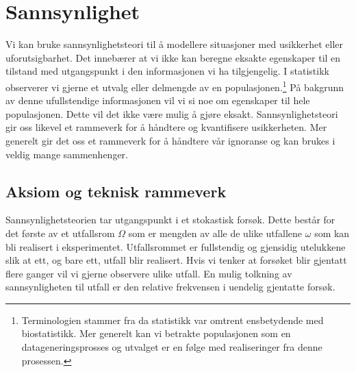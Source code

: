 \chapter{Sannsynlighet}
Vi kan bruke sannsynlighetsteori til å modellere situasjoner med usikkerhet eller uforutsigbarhet. Det innebærer at vi ikke kan beregne eksakte egenskaper til en tilstand med utgangspunkt i den informasjonen vi ha tilgjengelig. I statistikk observerer vi gjerne et utvalg eller delmengde av en populasjonen.\footnote{Terminologien stammer fra da statistikk var omtrent ensbetydende med biostatistikk. Mer generelt kan vi betrakte populasjonen som en datageneringsprosses og utvalget er en følge med realiseringer fra denne prosessen.} På bakgrunn av denne ufullstendige informasjonen vil vi si noe om egenskaper til hele populasjonen. Dette vil det ikke være mulig å gjøre eksakt. Sannsynlighetsteori gir oss likevel et rammeverk for å håndtere og kvantifisere usikkerheten. Mer generelt gir det oss et rammeverk for å håndtere vår ignoranse og kan brukes i veldig mange sammenhenger.
\section{Aksiom og teknisk rammeverk}
Sannsynlighetsteorien tar utgangspunkt i et stokastisk forsøk. Dette består for det første av et utfallsrom $\Omega$ som er mengden av alle de ulike utfallene $\omega$ som kan bli realisert i eksperimentet. Utfallsrommet er fullstendig og gjensidig utelukkene slik at ett, og bare ett, utfall blir realisert. Hvis vi tenker at forsøket blir gjentatt flere ganger vil vi gjerne observere ulike utfall. En mulig tolkning av sannsynligheten til utfall er den relative frekvensen i uendelig gjentatte forsøk.

